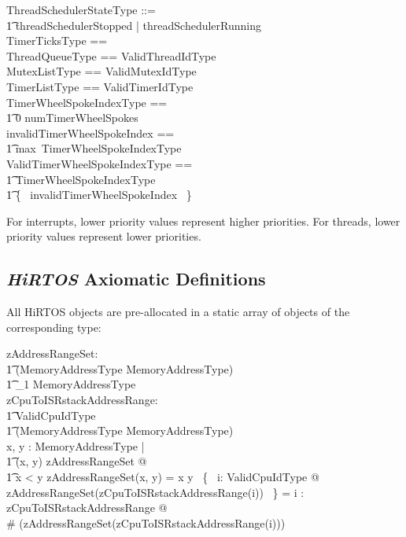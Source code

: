 \documentclass[11pt,letterpaper,twoside,openany]{book}
\begin{document}
\begin{zed}
    ThreadSchedulerStateType ::= \\
    \t1 threadSchedulerStopped | threadSchedulerRunning \\
    TimerTicksType == \nat \\
    ThreadQueueType == \iseq ValidThreadIdType \\
    MutexListType == \iseq ValidMutexIdType \\
    TimerListType == \iseq ValidTimerIdType \\
    TimerWheelSpokeIndexType == \\
    \t1 0 \upto numTimerWheelSpokes \\
    invalidTimerWheelSpokeIndex == \\
    \t1 max~TimerWheelSpokeIndexType \\
    ValidTimerWheelSpokeIndexType == \\
    \t1 TimerWheelSpokeIndexType ~\setminus \\
    \t1 \{~ invalidTimerWheelSpokeIndex ~\} \\
\end{zed}

For interrupts, lower priority values represent higher priorities. For threads, lower priority
values represent lower priorities.

\subsection{\emph{HiRTOS} Axiomatic Definitions}

All HiRTOS objects are pre-allocated in a static array of objects of the corresponding type:

\begin{axdef}
    zAddressRangeSet: \\
    \t1 (MemoryAddressType \cross MemoryAddressType) \inj \\
    \t1 \finset_1 MemoryAddressType \\
    zCpuToISRstackAddressRange: \\
    \t1 ValidCpuIdType \inj \\
    \t1 (MemoryAddressType \cross MemoryAddressType) \\
\where
    \forall x, y : MemoryAddressType | \\
   \t1  (x, y) \in \dom zAddressRangeSet @ \\
   \t1 x < y \land zAddressRangeSet(x, y) = x \upto y
\also
    \bigcap~\{~ i: ValidCpuIdType @ \\
      zAddressRangeSet(zCpuToISRstackAddressRange(i)) ~\} = \emptyset
\also
    \forall i : \dom zCpuToISRstackAddressRange @ \\
       \# (zAddressRangeSet(zCpuToISRstackAddressRange(i))) 
\end{axdef}
\end{document}
